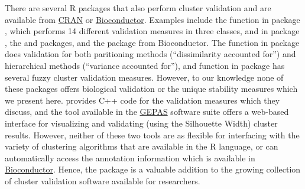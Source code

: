 \documentclass[11pt]{article}
\begin{document}
There are several R packages that also perform cluster validation and are available from
\href{http://www.r-project.org}{CRAN} or
\href{http://www.bioconductor.org}{Bioconductor}.   
Examples include the  function in package  \citep{cclust}, which performs 14
different validation measures in three classes,  %
 and  in package  \citep{fpc}, the
 \citep{clusterRepro} and 
\citep{clusterSim} packages, and the
 \citep{clusterStab} package from Bioconductor.  
The  function in package  \citep{clue} does validation
for both paritioning methods (``dissimilarity accounted for'') and
hierarchical methods (``variance accounted for''), and  %
function  in package  \citep{e1071} has several fuzzy
cluster validation measures.  
However, to our knowledge none of these packages offers biological validation or the
unique stability measures which we present here.  \citet{Han2005}
provides C++ code for the validation measures which they discuss, and
the  tool
available in the \href{http://gepas.bioinfo.cipf.es/}{GEPAS} software
suite offers a web-based interface for visualizing and validating
(using the Silhouette Width) cluster results.  However, neither of
these two tools are as flexible for interfacing with the variety of
clustering algorithms that are available in the R language, or can
automatically access the annotation information which is available in
\href{http://www.bioconductor.org/}{Bioconductor}.  %
Hence, the  package is a valuable addition to the growing
collection of cluster validation software available for researchers.



{\small
  
  
}


%
%
\end{document}
